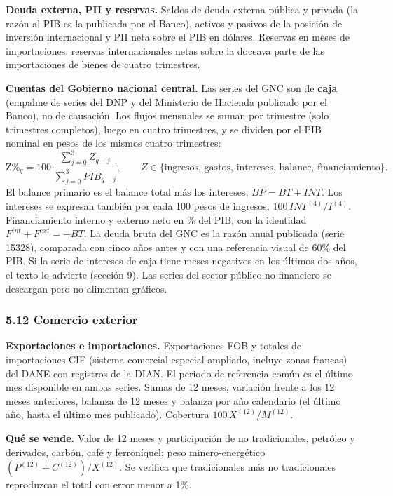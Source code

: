\textbf{Deuda externa, PII y reservas.} Saldos de deuda externa pública
y privada (la razón al PIB es la publicada por el Banco), activos y
pasivos de la posición de inversión internacional y PII neta sobre el
PIB en dólares. Reservas en meses de importaciones: reservas
internacionales netas sobre la doceava parte de las importaciones de
bienes de cuatro trimestres.

\textbf{Cuentas del Gobierno nacional central.} Las series del GNC son
de \textbf{caja} (empalme de series del DNP y del Ministerio de Hacienda
publicado por el Banco), no de causación. Los flujos mensuales se suman
por trimestre (solo trimestres completos), luego en cuatro trimestres, y
se dividen por el PIB nominal en pesos de los mismos cuatro trimestres:
\[\text{Z\%}_q=100\,\frac{\sum_{j=0}^{3}Z_{q-j}}{\sum_{j=0}^{3}PIB_{q-j}},\qquad Z\in\{\text{ingresos, gastos, intereses, balance, financiamiento}\}.\]
El balance primario es el balance total más los intereses,
\(BP=BT+INT\). Los intereses se expresan también por cada 100 pesos de
ingresos, \(100\,INT^{(4)}/I^{(4)}\). Financiamiento interno y externo
neto en \% del PIB, con la identidad \(F^{int}+F^{ext}=-BT\). La deuda
bruta del GNC es la razón anual publicada (serie 15328), comparada con
cinco años antes y con una referencia visual de 60\% del PIB. Si la
serie de intereses de caja tiene meses negativos en los últimos dos
años, el texto lo advierte (sección 9). Las series del sector público no
financiero se descargan pero no alimentan gráficos.

\hypertarget{comercio-exterior}{%
\subsubsection{5.12 Comercio exterior}\label{comercio-exterior}}

\textbf{Exportaciones e importaciones.} Exportaciones FOB y totales de
importaciones CIF (sistema comercial especial ampliado, incluye zonas
francas) del DANE con registros de la DIAN. El periodo de referencia
común es el último mes disponible en ambas series. Sumas de 12 meses,
variación frente a los 12 meses anteriores, balanza de 12 meses y
balanza por año calendario (el último año, hasta el último mes
publicado). Cobertura \(100\,X^{(12)}/M^{(12)}\).

\textbf{Qué se vende.} Valor de 12 meses y participación de no
tradicionales, petróleo y derivados, carbón, café y ferroníquel; peso
minero-energético \((P^{(12)}+C^{(12)})/X^{(12)}\). Se verifica que
tradicionales más no tradicionales reproduzcan el total con error menor
a 1\%.

